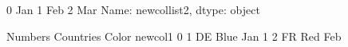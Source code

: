 \documentclass[letterpaper,10pt,english]{jupyterBook}
\begin{document}
\begin{sphinxVerbatim}[commandchars=\\\{\}]
0    Jan
1    Feb
2    Mar
Name: new\PYGZus{}col\PYGZus{}list2, dtype: object
\end{sphinxVerbatim}

\begin{sphinxVerbatim}[commandchars=\\\{\}]
\end{sphinxVerbatim}

\begin{sphinxVerbatim}[commandchars=\\\{\}]
   Numbers Countries Color new\PYGZus{}col1
0        1        DE  Blue      Jan
1        2        FR   Red      Feb
\end{sphinxVerbatim}







\renewcommand{\indexname}{Index}
\printindex
\end{document}
